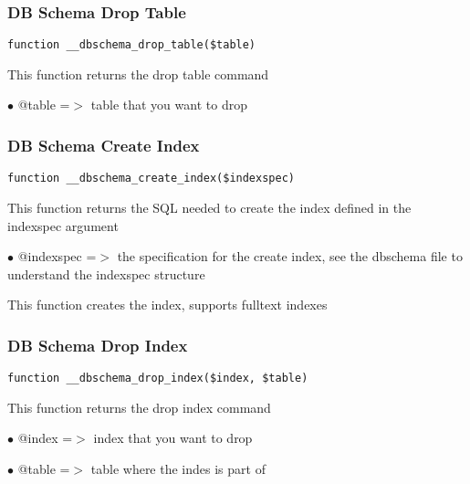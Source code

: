 \documentclass[a4paper]{article}
\begin{document}
\hypertarget{toc432}{}
\subsubsection{DB Schema Drop Table}

\begin{lstlisting}
function __dbschema_drop_table($table)
\end{lstlisting}

This function returns the drop table command

\begin{compactitem}
\item[\color{myblue}$\bullet$] @table =$>$ table that you want to drop
\end{compactitem}

\hypertarget{toc433}{}
\subsubsection{DB Schema Create Index}

\begin{lstlisting}
function __dbschema_create_index($indexspec)
\end{lstlisting}

This function returns the SQL needed to create the index defined in the
indexspec argument

\begin{compactitem}
\item[\color{myblue}$\bullet$] @indexspec =$>$ the specification for the create index, see the dbschema
              file to understand the indexspec structure
\end{compactitem}

This function creates the index, supports fulltext indexes

\hypertarget{toc434}{}
\subsubsection{DB Schema Drop Index}

\begin{lstlisting}
function __dbschema_drop_index($index, $table)
\end{lstlisting}

This function returns the drop index command

\begin{compactitem}
\item[\color{myblue}$\bullet$] @index =$>$ index that you want to drop
\item[\color{myblue}$\bullet$] @table =$>$ table where the indes is part of
\end{compactitem}
\end{document}
